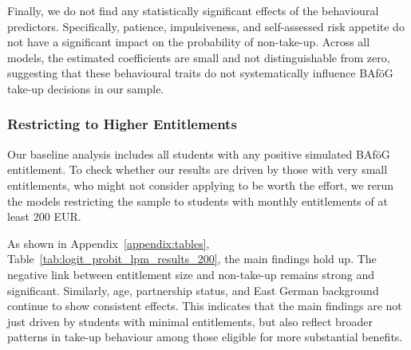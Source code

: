 Finally, we do not find any statistically significant effects of the behavioural predictors. Specifically, patience, impulsiveness, and self-assessed risk appetite do not have a significant impact on the probability of non-take-up.
Across all models, the estimated coefficients are small and not distinguishable from zero, suggesting that these behavioural traits do not systematically influence BAföG take-up decisions in our sample.


\subsubsection{Restricting to Higher Entitlements}
Our baseline analysis includes all students with any positive simulated BAföG entitlement. 
To check whether our results are driven by those with very small entitlements, who might not consider applying to be worth the effort, we rerun the models restricting the sample to students with monthly entitlements of at least 200 EUR.

As shown in Appendix~\ref{appendix:tables}, Table~\ref{tab:logit_probit_lpm_results_200}, the main findings hold up. The negative link between entitlement size and non-take-up remains strong and significant. Similarly, age, partnership status, and East German background continue to show consistent effects. This indicates that the main findings are not just driven by students with minimal entitlements, but also reflect broader patterns in take-up behaviour among those eligible for more substantial benefits.
